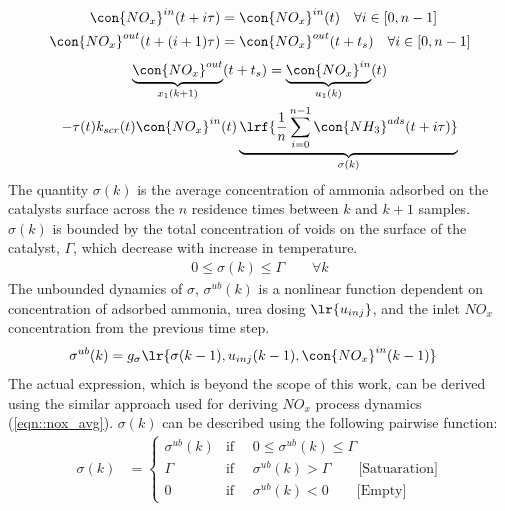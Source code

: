 \begin{align}
    \con{NO_x}^{in} (t + i \tau) &= \con{NO_x}^{in}(t) \quad \forall i \in [0, n-1]  \label{eqn::zero_in}\\
    \con{NO_x}^{out} (t + (i+1) \tau) &= \con{NO_x}^{out}(t + t_s) \quad \forall i \in [0, n-1] \label{eqn::zero_out}
\end{align}
\begin{multline}
        \underbrace{\con{NO_x}^{out}}_{x_1(k+1)}(t+t_s) =
                \underbrace{\con{NO_x}^{in}}_{u_1(k)}(t) \\
                - \tau(t) k_{scr}(t) \con{NO_x}^{in}(t) \underbrace{\lrf{\frac{1}{n} \sum_{i = 0}^{n-1} \con{NH_3}^{ads}(t + i \tau)}}_{\sigma(k)}
        \label{eqn::nox_avg}
\end{multline}
%
%
The quantity $\sigma(k)$ is the average concentration of ammonia adsorbed on the catalysts surface across the $n$ residence times between $k$ and $k+1$ samples. $\sigma(k)$ is bounded by the total concentration of voids on the surface of the catalyst, $\Gamma$, which decrease with increase in temperature.
\begin{align}
    0 \leq \sigma(k) \leq \Gamma \qquad \forall k
\end{align}
The unbounded dynamics of $\sigma$, $\sigma^{ub}(k)$ is a nonlinear function dependent on concentration of adsorbed ammonia, urea dosing $\lr{u_{inj}}$, and the inlet $NO_x$ concentration from the previous time step.
\begin{align}
    \sigma^{ub}(k) &= g_{\sigma} \lr{ \sigma(k-1), u_{inj}(k-1), \con{NO_x}^{in}(k-1) }
\end{align}
The actual expression, which is beyond the scope of this work, can be derived using the similar approach used for
deriving $NO_x$ process dynamics (\ref{eqn::nox_avg}). $\sigma(k)$ can be described using the following pairwise
function:
\begin{align}
    \sigma(k) &=
    \begin{cases}
        \sigma^{ub}(k) & \text{if } \quad 0 \leq \sigma^{ub}(k) \leq \Gamma \\
        \Gamma         & \text{if } \quad \sigma^{ub}(k) > \Gamma \qquad \text{[Satuaration]}\\
        0              & \text{if } \quad \sigma^{ub}(k) < 0 \qquad \text{[Empty]}
    \end{cases}
\end{align}
